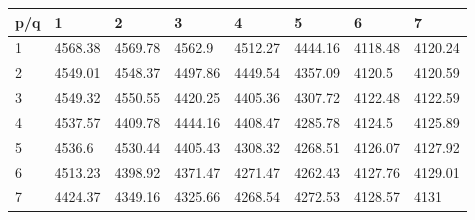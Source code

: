 \begin{tabular}{llllllll}
\toprule
p/q &        1 &        2 &        3 &        4 &        5 &        6 &        7 \\
\midrule
  1 &  4568.38 &  4569.78 &   4562.9 &  4512.27 &  4444.16 &  4118.48 &  4120.24 \\
  2 &  4549.01 &  4548.37 &  4497.86 &  4449.54 &  4357.09 &   4120.5 &  4120.59 \\
  3 &  4549.32 &  4550.55 &  4420.25 &  4405.36 &  4307.72 &  4122.48 &  4122.59 \\
  4 &  4537.57 &  4409.78 &  4444.16 &  4408.47 &  4285.78 &   4124.5 &  4125.89 \\
  5 &   4536.6 &  4530.44 &  4405.43 &  4308.32 &  4268.51 &  4126.07 &  4127.92 \\
  6 &  4513.23 &  4398.92 &  4371.47 &  4271.47 &  4262.43 &  4127.76 &  4129.01 \\
  7 &  4424.37 &  4349.16 &  4325.66 &  4268.54 &  4272.53 &  4128.57 &     4131 \\
\bottomrule
\end{tabular}
